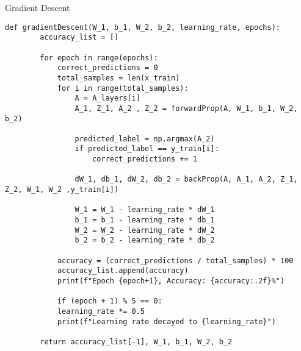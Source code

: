 \documentclass[a4paper,12pt]{article}
\begin{document}
    \begin{algorithm}[H]
    \caption{Gradient Descent}
    \begin{lstlisting}[style=pythonstyle]
    def gradientDescent(W_1, b_1, W_2, b_2, learning_rate, epochs):
        accuracy_list = []
        
        for epoch in range(epochs):
            correct_predictions = 0
            total_samples = len(x_train)
            for i in range(total_samples):
                A = A_layers[i]
                A_1, Z_1, A_2 , Z_2 = forwardProp(A, W_1, b_1, W_2, b_2)
    
                predicted_label = np.argmax(A_2)
                if predicted_label == y_train[i]:
                    correct_predictions += 1
    
                dW_1, db_1, dW_2, db_2 = backProp(A, A_1, A_2, Z_1, Z_2, W_1, W_2 ,y_train[i])
    
                W_1 = W_1 - learning_rate * dW_1
                b_1 = b_1 - learning_rate * db_1
                W_2 = W_2 - learning_rate * dW_2
                b_2 = b_2 - learning_rate * db_2
            
            accuracy = (correct_predictions / total_samples) * 100
            accuracy_list.append(accuracy)
            print(f"Epoch {epoch+1}, Accuracy: {accuracy:.2f}%")
    
            if (epoch + 1) % 5 == 0:
            learning_rate *= 0.5
            print(f"Learning rate decayed to {learning_rate}")
    
        return accuracy_list[-1], W_1, b_1, W_2, b_2
    \end{lstlisting}
    \end{algorithm}
    
\end{document}
